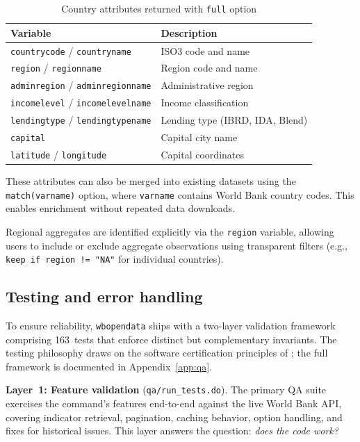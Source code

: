 \documentclass[bib]{statapress}
\begin{document}
\begin{table}[H]
\centering
\caption{Country attributes returned with \texttt{full} option}
\label{tab:attributes}
\begin{tabular}{ll}
\hline
Variable & Description \\
\hline
\texttt{countrycode} / \texttt{countryname} & ISO3 code and name \\
\texttt{region} / \texttt{regionname} & Region code and name \\
\texttt{adminregion} / \texttt{adminregionname} & Administrative region \\
\texttt{incomelevel} / \texttt{incomelevelname} & Income classification \\
\texttt{lendingtype} / \texttt{lendingtypename} & Lending type (IBRD, IDA, Blend) \\
\texttt{capital} & Capital city name \\
\texttt{latitude} / \texttt{longitude} & Capital coordinates \\
\hline
\end{tabular}
\end{table}

These attributes can also be merged into existing datasets using the
\texttt{match(varname)} option, where \texttt{varname} contains World Bank
country codes. This enables enrichment without repeated data downloads.

Regional aggregates are identified explicitly via the \texttt{region} variable,
allowing users to include or exclude aggregate observations using transparent
filters (e.g., \texttt{keep if region != "NA"} for individual countries).

\subsection{Testing and error handling}

To ensure reliability, \texttt{wbopendata} ships with a two-layer validation
framework comprising 163~tests that enforce distinct but complementary
invariants. The testing philosophy draws on the software certification
principles of \citet{gould2001certification}; the full framework is
documented in Appendix~\ref{app:qa}.

\textbf{Layer~1: Feature validation} (\texttt{qa/run\_tests.do}).  The
primary QA suite exercises the command's features end-to-end against the
live World Bank API, covering indicator retrieval, pagination, caching
behavior, option handling, and fixes for historical issues.  This layer
answers the question: \emph{does the code work?}
\end{document}
